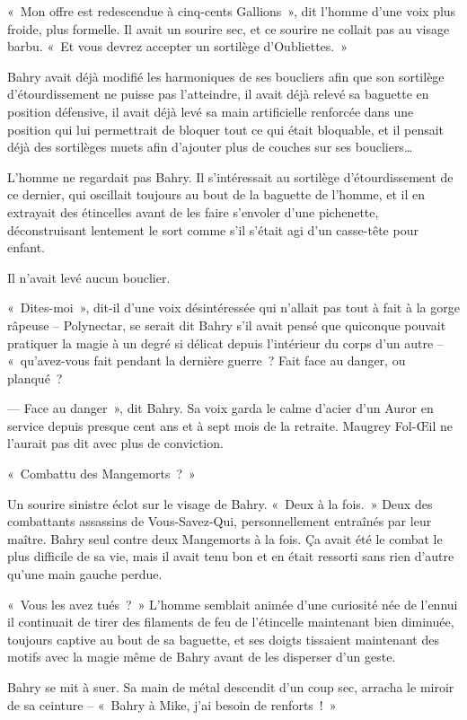 «~Mon offre est redescendue à cinq-cents Gallions~», dit l'homme d'une voix plus froide, plus formelle. Il avait un sourire sec, et ce sourire ne collait pas au visage barbu. «~Et vous devrez accepter un sortilège d'Oubliettes.~»

Bahry avait déjà modifié les harmoniques de ses boucliers afin que son sortilège d'étourdissement ne puisse pas l'atteindre, il avait déjà relevé sa baguette en position défensive, il avait déjà levé sa main artificielle renforcée dans une position qui lui permettrait de bloquer tout ce qui était bloquable, et il pensait déjà des sortilèges muets afin d'ajouter plus de couches sur ses boucliers…

L'homme ne regardait pas Bahry. Il s'intéressait au sortilège d'étourdissement de ce dernier, qui oscillait toujours au bout de la baguette de l'homme, et il en extrayait des étincelles avant de les faire s'envoler d'une pichenette, déconstruisant lentement le sort comme s'il s'était agi d'un casse-tête pour enfant.

Il n'avait levé aucun bouclier.

«~Dites-moi~», dit-il d'une voix désintéressée qui n'allait pas tout à fait à la gorge râpeuse -- Polynectar, se serait dit Bahry s'il avait pensé que quiconque pouvait pratiquer la magie à un degré si délicat depuis l'intérieur du corps d'un autre -- «~qu'avez-vous fait pendant la dernière guerre~? Fait face au danger, ou planqué~?

--- Face au danger~», dit Bahry. Sa voix garda le calme d'acier d'un Auror en service depuis presque cent ans et à sept mois de la retraite. Maugrey Fol-Œil ne l'aurait pas dit avec plus de conviction.

«~Combattu des Mangemorts~?~»

Un sourire sinistre éclot sur le visage de Bahry. «~Deux à la fois.~» Deux des combattants assassins de Vous-Savez-Qui, personnellement entraînés par leur maître. Bahry seul contre deux Mangemorts à la fois. Ça avait été le combat le plus difficile de sa vie, mais il avait tenu bon et en était ressorti sans rien d'autre qu'une main gauche perdue.

«~Vous les avez tués~?~» L'homme semblait animée d'une curiosité née de l'ennui il continuait de tirer des filaments de feu de l'étincelle maintenant bien diminuée, toujours captive au bout de sa baguette, et ses doigts tissaient maintenant des motifs avec la magie même de Bahry avant de les disperser d'un geste.

Bahry se mit à suer. Sa main de métal descendit d'un coup sec, arracha le miroir de sa ceinture -- «~Bahry à Mike, j'ai besoin de renforts~!~»

